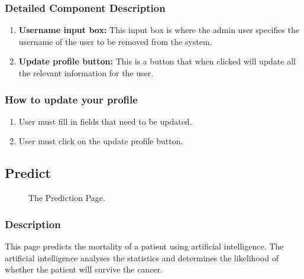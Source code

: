 \documentclass[14pt, a4paper]{article}
\begin{document}
\subsubsection{Detailed Component Description}
\begin{enumerate}
\item \textbf{Username input box:} This input box is where the admin user specifies the username of the user to be removed from the system.
\item \textbf{Update profile button:} This is a button that when clicked will update all the relevant information for the user.
\end{enumerate}
\subsubsection{How to update your profile}
\begin{enumerate}
\item User must fill in fields that need to be updated.
\item User must click on the update profile button.
\end{enumerate}
\subsection{Predict}
\begin{figure}[H]
\centerline{}
\caption{The Prediction Page.}
\label{fig:predict1}
\end{figure}
\subsubsection{Description} This page predicts the mortality of a patient using artificial intelligence. The artificial intelligence analyses the statistics and determines the likelihood of whether the patient will survive the cancer.
\end{document}
